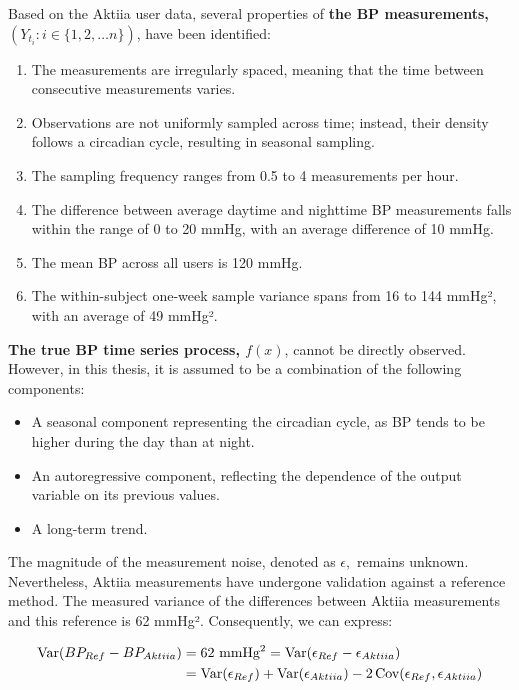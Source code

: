 Based on the Aktiia user data, several properties of \textbf{the BP
measurements, $(Y_{t_i}: i \in \{1, 2, \dots n\})$}, have been identified:

\begin{enumerate}
\item The measurements are irregularly spaced, meaning that the time between
consecutive measurements varies.
\item Observations are not uniformly sampled across time; instead, their
density follows a circadian cycle, resulting in seasonal sampling.
\item The sampling frequency ranges from 0.5 to 4 measurements per hour.
\item The difference between average daytime and nighttime BP measurements
falls within the range of 0 to 20 mmHg, with an average difference of 10 mmHg.
\item The mean BP across all users is 120 mmHg.
\item The within-subject one-week sample variance spans from 16 to 144
mmHg², with an average of 49 mmHg².
\end{enumerate}


\textbf{The true BP time series process, $f(x)$}, cannot be directly observed.
However, in this thesis, it
is assumed to be a combination of the following components:

\begin{itemize}
\item A seasonal component representing the circadian cycle, as BP tends to be
higher during the day than at night.
\item An autoregressive component, reflecting the dependence of the output
variable on its previous values.
\item A long-term trend.
\end{itemize}

The magnitude of the measurement noise, denoted as $\epsilon,$ remains unknown.
Nevertheless, Aktiia measurements have undergone validation against a reference
method. The measured variance of the differences between Aktiia measurements and
this reference is 62 mmHg². Consequently, we can express:

\begin{align*}
    \operatorname{Var}(BP_{Ref} - BP_{Aktiia})
    & = \text{62 mmHg\textsuperscript{2}} = \operatorname{Var}(\epsilon_{Ref} - \epsilon_{Aktiia}) \\
    & = \operatorname{Var}(\epsilon_{Ref}) + \operatorname{Var}(\epsilon_{Aktiia}) - 2\operatorname{Cov}(\epsilon_{Ref},
    \epsilon_{Aktiia})
\end{align*}

